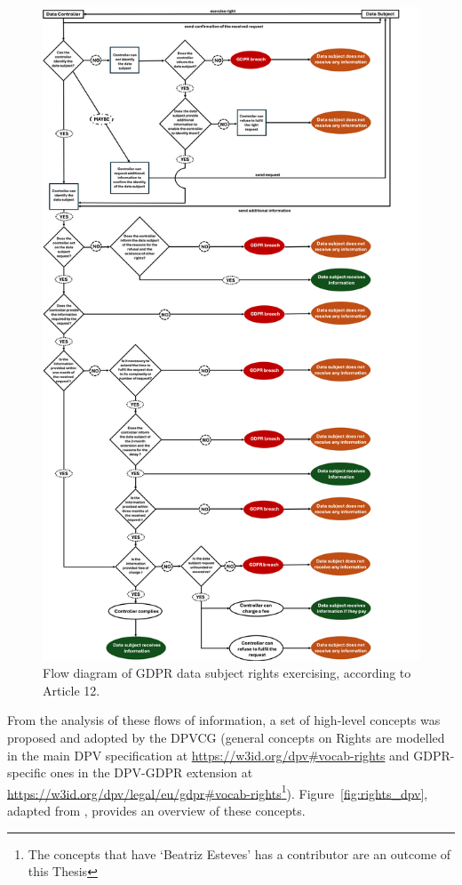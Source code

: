 \begin{figure}[htp]
    \centering
    \includegraphics[width=0.78\linewidth]{figures/chapter-4/GDPR-DSR.png}
    \caption[Flow diagram of GDPR data subject rights exercising.]{Flow diagram of GDPR data subject rights exercising, according to Article 12.}
    \label{fig:gdpr-rights}
\end{figure}

From the analysis of these flows of information, a set of high-level concepts was proposed and adopted by the DPVCG (general concepts on Rights are modelled in the main DPV specification at \url{https://w3id.org/dpv#vocab-rights} and GDPR-specific ones in the DPV-GDPR extension at \url{https://w3id.org/dpv/legal/eu/gdpr#vocab-rights}\footnote{The concepts that have `Beatriz Esteves' has a contributor are an outcome of this Thesis}).
Figure~\ref{fig:rights_dpv}, adapted from \cite{pandit_primer_2022}, provides an overview of these concepts.

